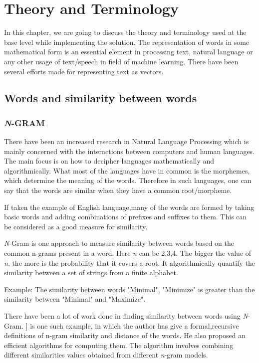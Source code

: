 \chapter{Theory and Terminology}
\label{cha:solutioni}

In this chapter, we are going to discuss the theory and terminology used at the base level while implementing the solution.
The representation of words in some mathematical form is an essential element in processing text, natural language or any other usage of text/speech in field of machine learning. There have been several efforts made for representing text as vectors.

\section{Words and similarity between words }
\subsection{\textit{N}-GRAM}
There have been an increased research in Natural Language Processing which is mainly concerned with the interactions between computers and human languages. The main focus is on how to decipher languages mathematically and algorithmically. What most of the languages have in common is the morphemes, which determine the meaning of the words. Therefore in such languages, one can say that the words are similar when they have a common root/morpheme. 

If taken the example of English language,many of the words are formed by taking basic words and adding combinations of prefixes and suffixes to them. This can be considered as a good measure for similarity. 

\textit{N}-Gram is one approach to measure similarity between words  based on the common n-grams present in a word. Here \textit{n} can be 2,3,4. The bigger the value of \textit{n}, the more is the probability that it covers a root. It algorithmically quantify the similarity between a set of strings from a finite alphabet. 

\begin{center}
	Example: The similarity between words "Minimal", "Minimize" is greater than the similarity between "Minimal" and "Maximize".
\end{center}

There have been a lot of work done in finding similarity between words using \textit{N}-Gram. ]\cite{kondrak2005n} is one such example, in which the author has give a formal,recursive definitions of n-gram similarity and distance of the words. He also proposed an efficient algorithms for computing them. The algorithm involves combining different similarities values obtained from different \textit{n}-gram models. 

